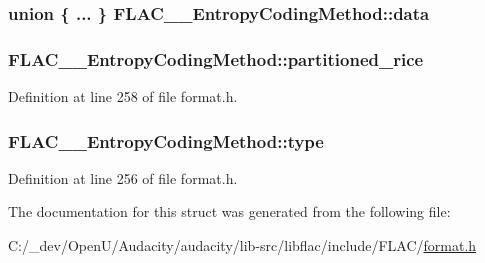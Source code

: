 \subsubsection[{\texorpdfstring{data}{data}}]{\setlength{\rightskip}{0pt plus 5cm}union \{ ... \}   F\+L\+A\+C\+\_\+\+\_\+\+Entropy\+Coding\+Method\+::data}\hypertarget{struct_f_l_a_c_____entropy_coding_method_a89c2a74756c8626072a796eeb2471ebd}{}\label{struct_f_l_a_c_____entropy_coding_method_a89c2a74756c8626072a796eeb2471ebd}
\subsubsection[{\texorpdfstring{partitioned\+\_\+rice}{partitioned_rice}}]{ F\+L\+A\+C\+\_\+\+\_\+\+Entropy\+Coding\+Method\+::partitioned\+\_\+rice}\hypertarget{struct_f_l_a_c_____entropy_coding_method_a41d493a19d5c01ec7a06a5b3d83adf8b}{}\label{struct_f_l_a_c_____entropy_coding_method_a41d493a19d5c01ec7a06a5b3d83adf8b}


Definition at line 258 of file format.\+h.

\subsubsection[{\texorpdfstring{type}{type}}]{ F\+L\+A\+C\+\_\+\+\_\+\+Entropy\+Coding\+Method\+::type}\hypertarget{struct_f_l_a_c_____entropy_coding_method_abe41e84858fd130777b7cc3c27e400f8}{}\label{struct_f_l_a_c_____entropy_coding_method_abe41e84858fd130777b7cc3c27e400f8}


Definition at line 256 of file format.\+h.



The documentation for this struct was generated from the following file\+:\begin{DoxyCompactItemize}
\item 
C\+:/\+\_\+dev/\+Open\+U/\+Audacity/audacity/lib-\/src/libflac/include/\+F\+L\+A\+C/\hyperlink{include_2_f_l_a_c_2format_8h}{format.\+h}\end{DoxyCompactItemize}
